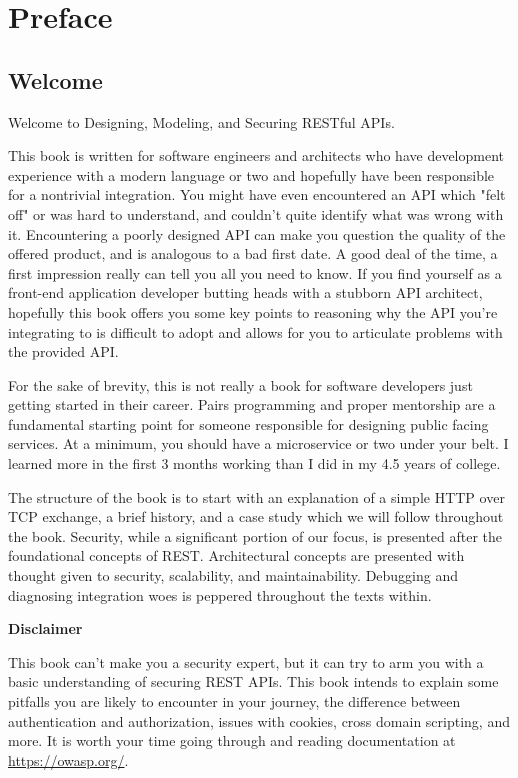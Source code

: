\chapter*{Preface}

\section*{Welcome}

Welcome to Designing, Modeling, and Securing RESTful APIs.

This book is written for software engineers and architects who have development experience with a modern language or two and hopefully have been responsible for a nontrivial integration.  You might have even encountered an API which "felt off" or was hard to understand, and couldn't quite identify what was wrong with it.  Encountering a poorly designed API can make you question the quality of the offered product, and is analogous to a bad first date.  A good deal of the time, a first impression really can tell you all you need to know.  If you find yourself as a front-end application developer butting heads with a stubborn API architect, hopefully this book offers you some key points to reasoning why the API you're integrating to is difficult to adopt and allows for you to articulate problems with the provided API.

For the sake of brevity, this is not really a book for software developers just getting started in their career.  Pairs programming and proper mentorship are a fundamental starting point for someone responsible for designing public facing services.  At a minimum, you should have a microservice or two under your belt.  I learned more in the first 3 months working than I did in my 4.5 years of college.

The structure of the book is to start with an explanation of a simple HTTP over TCP exchange, a brief history, and a case study which we will follow throughout the book.  Security, while a significant portion of our focus, is presented after the foundational concepts of REST.  Architectural concepts are presented with thought given to security, scalability, and maintainability. Debugging and diagnosing integration woes is peppered throughout the texts within.

\begin{sidebar}
\begin{center}
\textbf{Disclaimer}
\end{center}
This book can't make you a security expert, but it can try to arm you with a basic understanding of securing REST APIs.  This book intends to explain some pitfalls you are likely to encounter in your journey, the difference between authentication and authorization, issues with cookies, cross domain scripting, and more.  It is worth your time going through and reading documentation at \url{https://owasp.org/}.
\end{sidebar}


